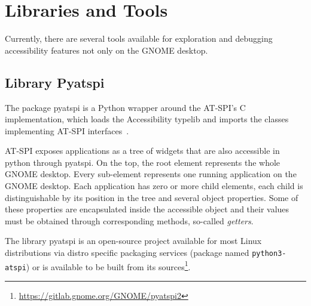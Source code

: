 \section{Libraries and Tools}
Currently, there are several tools available for exploration and debugging accessibility features not only on the GNOME desktop.

\subsection{Library Pyatspi}\label{library_pyatspi}
The package pyatspi is a Python wrapper around the AT-SPI's C implementation, which loads the Accessibility typelib and imports the classes implementing AT-SPI interfaces~\cite{pyatspi}.

AT-SPI exposes applications as a tree of widgets that are also accessible in python through pyatspi. On the top, the root element represents the whole GNOME desktop. Every sub-element represents one running application on the GNOME desktop. Each application has zero or more child elements, each child is distinguishable by its position in the tree and several object properties. Some of these properties are encapsulated inside the accessible object and their values must be obtained through corresponding methods, so-called \textit{getters}. 

The library pyatspi is an open-source project available for most Linux distributions via distro specific packaging services (package named \texttt{python3-atspi}) or is available to be built from its sources\footnote{\url{https://gitlab.gnome.org/GNOME/pyatspi2}}.

